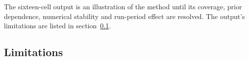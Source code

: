 The sixteen-cell output is an illustration of the method until its coverage, prior dependence, numerical stability and run-period effect are resolved. The output's limitations are listed in section~\ref{sec:limitations}.

\label{sec:limits}

\subsection{Limitations}
\label{sec:limitations}

